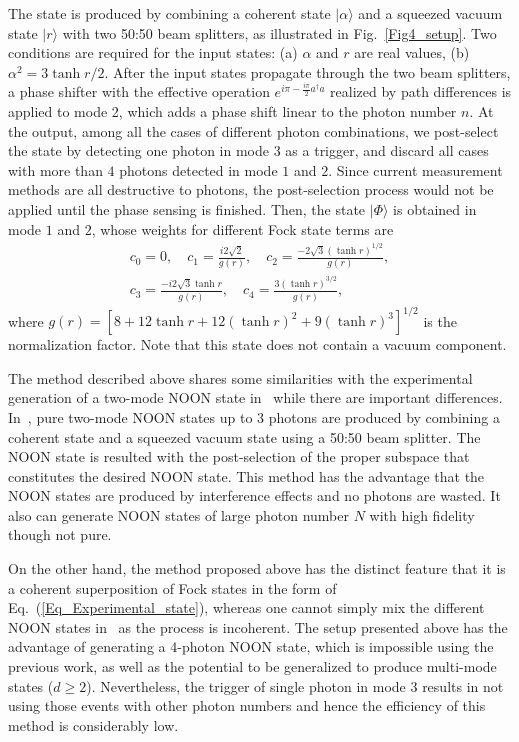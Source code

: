 \documentclass[aps,pra,reprint,showpacs,groupedaddress]{revtex4-1}
\begin{document}
The state is produced by combining a coherent state $|\alpha\rangle$ and a squeezed vacuum state $|r\rangle$ with two 50:50 beam splitters, as illustrated in Fig.~\ref{Fig4_setup}. Two conditions are required for the input states: (a) $\alpha$ and $r$ are real values, (b) $\alpha^2=3\tanh{r}/2$.
After the input states propagate through the two beam splitters, a phase shifter with the effective operation $e^{i\pi -\frac{i\pi}{2} a^\dagger a}$ realized by path differences is applied to mode 2, which adds a phase shift linear to the photon number $n$.  At the output, among all the cases of different photon combinations, we post-select the state by detecting one photon in mode $3$ as a trigger, and discard all cases with more than $4$ photons detected in mode $1$ and $2$.
Since current measurement methods are all destructive to photons, the post-selection process would not be applied until the phase sensing is finished.
Then, the state $|\Phi\rangle$ is obtained in mode $1$ and $2$, whose weights for different Fock state terms are
\begin{eqnarray}
    &\displaystyle
    c_0 = 0,
\quad
    c_1 = \frac{ i 2 \sqrt{2}}{g(r)},
\quad
    c_2 = \frac{-2 \sqrt{3} (\tanh{r})^{1/2}}{g(r)},
\nonumber\\
    &\displaystyle
    c_3 = \frac{- i 2 \sqrt{3} \tanh{r}}{g(r)},
\quad
    c_4 = \frac{3 (\tanh{r})^{3/2}}{g(r)},
    &
\end{eqnarray}
where $g(r)=[8+12\tanh{r}+12(\tanh{r})^2+9(\tanh{r})^3]^{1/2}$ is the normalization factor. Note that this state does not contain a vacuum component.

The method described above shares some similarities with the experimental generation of a two-mode NOON state in~\cite{Afek2010_NOON_experiments_cSqV} while there are important differences.  In~\cite{Afek2010_NOON_experiments_cSqV}, pure two-mode NOON states up to 3 photons are produced by combining a coherent state and a squeezed vacuum state using a 50:50 beam splitter.  The NOON state is resulted with the post-selection of the proper subspace that constitutes the desired NOON state.  This method has the advantage that the NOON states are produced by interference effects and no photons are wasted.  It also can generate NOON states of large photon number $N$ with high fidelity though not pure.

On the other hand, the method proposed above has the distinct feature that it is a coherent superposition of Fock states in the form of Eq.~(\ref{Eq_Experimental_state}), whereas one cannot simply mix the different NOON states in~\cite{Afek2010_NOON_experiments_cSqV} as the process is incoherent.  The setup presented above has the advantage of generating a $4$-photon NOON state, which is impossible using the previous work, as well as the potential to be generalized to produce multi-mode states ($d \ge 2$).   Nevertheless, the trigger of single photon in mode 3 results in not using those events with other photon numbers and hence the efficiency of this method is considerably low.
\end{document}

